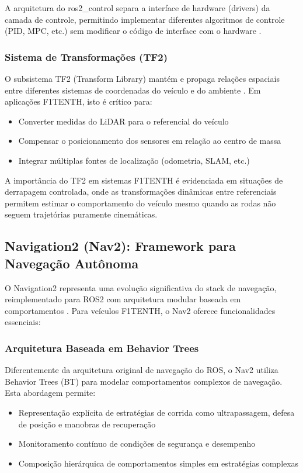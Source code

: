 A arquitetura do ros2\_control separa a interface de hardware (drivers) da
camada de controle, permitindo implementar diferentes algoritmos de controle
(PID, MPC, etc.) sem modificar o código de interface com o hardware
\cite{macenski2022robot}.

\subsubsection{Sistema de Transformações (TF2)}

O subsistema TF2 (Transform Library) mantém e propaga relações espaciais entre
diferentes sistemas de coordenadas do veículo e do ambiente \cite{foote2013tf}.
Em aplicações F1TENTH, isto é crítico para:

\begin{itemize}
    \item Converter medidas do LiDAR para o referencial do veículo
    \item Compensar o posicionamento dos sensores em relação ao centro de massa
    \item Integrar múltiplas fontes de localização (odometria, SLAM, etc.)
\end{itemize}

A importância do TF2 em sistemas F1TENTH é evidenciada em situações de
derrapagem controlada, onde as transformações dinâmicas entre referenciais
permitem estimar o comportamento do veículo mesmo quando as rodas não seguem
trajetórias puramente cinemáticas.

\subsection{Navigation2 (Nav2): Framework para Navegação Autônoma}

O Navigation2 representa uma evolução significativa do stack de navegação,
reimplementado para ROS2 com arquitetura modular baseada em comportamentos
\cite{macenski2020marathon}. Para veículos F1TENTH, o Nav2 oferece
funcionalidades essenciais:

\subsubsection{Arquitetura Baseada em Behavior Trees}

Diferentemente da arquitetura original de navegação do ROS, o Nav2 utiliza
Behavior Trees (BT) para modelar comportamentos complexos de navegação. Esta
abordagem permite:

\begin{itemize}
    \item Representação explícita de estratégias de corrida como ultrapassagem, defesa de
          posição e manobras de recuperação
    \item Monitoramento contínuo de condições de segurança e desempenho
    \item Composição hierárquica de comportamentos simples em estratégias complexas
\end{itemize}

